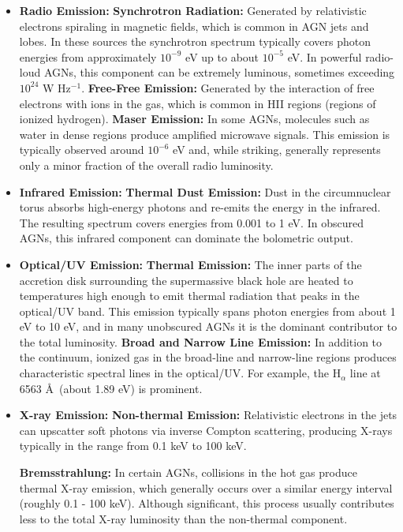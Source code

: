 \begin{itemize}
    \item \textbf{Radio Emission:}
    \subitem \textbf{Synchrotron Radiation:} Generated by relativistic electrons spiraling in magnetic fields, which is common in AGN jets and lobes. In these sources the synchrotron spectrum typically covers photon energies from approximately $10^{-9}$ eV up to about $10^{-5}$ eV. In powerful radio-loud AGNs, this component can be extremely luminous, sometimes exceeding $10^{24}$ W Hz$^{-1}$.
    \subitem \textbf{Free-Free Emission:} Generated by the interaction of free electrons with ions in the gas, which is common in HII regions (regions of ionized hydrogen).
    \subitem \textbf{Maser Emission:} In some AGNs, molecules such as water in dense regions produce amplified microwave signals. This emission is typically observed around $10^{-6}$ eV and, while striking, generally represents only a minor fraction of the overall radio luminosity.
    
    \item \textbf{Infrared Emission:}
    \subitem \textbf{Thermal Dust Emission:} Dust in the circumnuclear torus absorbs high-energy photons and re-emits the energy in the infrared. The resulting spectrum covers energies from 0.001 to 1 eV. In obscured AGNs, this infrared component can dominate the bolometric output.
    
    \item \textbf{Optical/UV Emission:}
    \subitem \textbf{Thermal Emission:} The inner parts of the accretion disk surrounding the supermassive black hole are heated to temperatures high enough to emit thermal radiation that peaks in the optical/UV band. This emission typically spans photon energies from about 1 eV to 10 eV, and in many unobscured AGNs it is the dominant contributor to the total luminosity.
    \subitem \textbf{Broad and Narrow Line Emission:} In addition to the continuum, ionized gas in the broad-line and narrow-line regions produces characteristic spectral lines in the optical/UV. For example, the H$_{\alpha}$ line at 6563 \AA\ (about 1.89 eV) is prominent.
    
    \item \textbf{X-ray Emission:}
    \subitem \textbf{Non-thermal Emission:} Relativistic electrons in the jets can upscatter soft photons via inverse Compton scattering, producing X-rays typically in the range from 0.1 keV to 100 keV.
    
    \subitem \textbf{Bremsstrahlung:} In certain AGNs, collisions in the hot gas produce thermal X-ray emission, which generally occurs over a similar energy interval (roughly 0.1 - 100 keV). Although significant, this process usually contributes less to the total X-ray luminosity than the non-thermal component.
    

\end{itemize}
